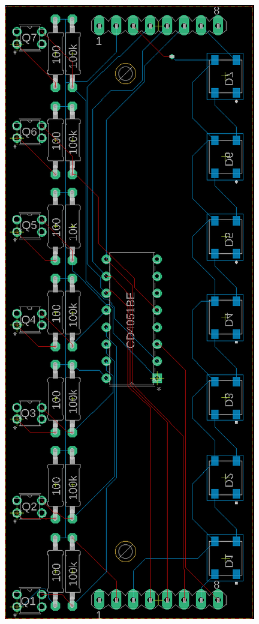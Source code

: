 \begin{figure}  
  \centering
  \includegraphics[angle=-90,width=\linewidth]{src/images/7-sensor-board-v0.1.0.png} 
  \caption{} 
  \Description{} 
  \label{fig:7-sensor-board}
\end{figure}

